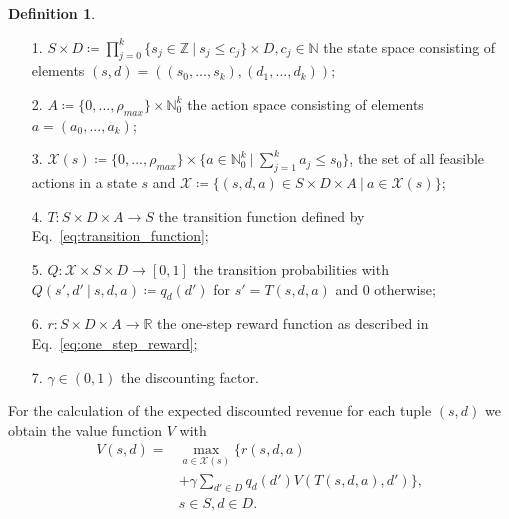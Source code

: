 \documentclass[journal, a4paper]{IEEEtran}
\theoremstyle{plain}
\theoremstyle{definition}
\newtheorem{defn}[thm]{Definition}
\begin{document}
\begin{defn} \label{def:modell} \
	\begin{itemize}
		\item[1.] $S \times D \coloneqq \prod\limits_{j=0}^{k} \{s_j \in \mathbb{Z} \ | \ s_j \leq c_j\} \times D, c_j \in \mathbb{N}$ the state space consisting of elements $(s,d) = ((s_0, ... , s_k), (d_1, ..., d_k))$;
		\item[2.] $ A \coloneqq  \{0, ..., \rho_{max} \} \times \mathbb{N}_0^k$ the action space consisting of elements $a = (a_0, ..., a_k)$;
		\item[3.] $ \mathcal{X} (s) \coloneqq \{0, ..., \rho_{max} \} \times \{a \in \mathbb{N}_0^k \ | \ \sum_{j=1}^{k}a_j \leq s_0  \}$, the set of all feasible actions in a state $s$ and $\mathcal{X} \coloneqq \{(s, d , a) \in S \times D \times A \ | \ a \in \mathcal{X} (s)\}$;
		\item[4.] $ T: S \times D \times A \rightarrow S$ the transition function defined by Eq.~\eqref{eq:transition_function};
		\item[5.] $ Q: \mathcal{X} \times S \times D \rightarrow [0,1]  $ the transition probabilities with $Q(s', d'\ |\ s, d, a) \coloneqq q_d(d')$ for $s' = T(s, d, a)$ and $0$ otherwise;
		\item[6.] $ r: S \times D \times A \rightarrow \mathbb{R} $ the one-step reward function as described in Eq.~\eqref{eq:one_step_reward};
		\item[7.] $\gamma \in (0, 1) $ the discounting factor.
	\end{itemize}
\end{defn}
For the calculation of the expected discounted revenue for each tuple $(s, d)$ we obtain the value function $V$ with\\
\begin{equation}
	\label{eq:ValueFunction}
	\begin{split}
		V(s,d) = &\max_{a \in \mathcal{X} (s)} \{ r(s, d, a)  \\
		&+ \gamma \sum_{d' \in D} q_d(d') V(T(s, d, a), d') \}, \\ 
		&s \in S, d \in D. 
	\end{split}
\end{equation}
\end{document}
